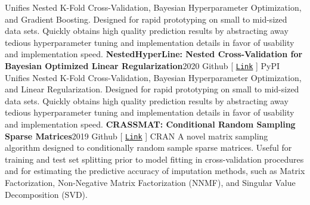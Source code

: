 \documentclass{article}
\begin{document}
        Unifies Nested K-Fold Cross-Validation, Bayesian Hyperparameter Optimization, and Gradient Boosting. Designed for rapid prototyping on small to mid-sized data sets. Quickly obtains high quality prediction results by abstracting away tedious hyperparameter tuning and implementation details in favor of usability and implementation speed.\newline\newline
        \textbf{NestedHyperLine: Nested Cross-Validation for Bayesian Optimized Linear Regularization}\hfill{2020}\newline
        \faGithub\space Github [ \href{https://github.com/nickkunz/nestedhyperline}{\texttt{Link}} ] \space\faPython\space PyPI\newline\newline
        Unifies Nested K-Fold Cross-Validation, Bayesian Hyperparameter Optimization, and Linear Regularization. Designed for rapid prototyping on small to mid-sized data sets. Quickly obtains high quality prediction results by abstracting away tedious hyperparameter tuning and implementation details in favor of usability and implementation speed.\newline\newline
        \textbf{CRASSMAT: Conditional Random Sampling Sparse Matrices}\hfill{2019}\newline
        \faGithub\space Github [ \href{https://github.com/nickkunz/crassmat}{\texttt{Link}} ] \space\faRProject\space CRAN\newline\newline
        A novel matrix sampling algorithm designed to conditionally random sample sparse matrices. Useful for training and test set splitting prior to model fitting in cross-validation procedures and for estimating the predictive accuracy of imputation methods, such as Matrix Factorization, Non-Negative Matrix Factorization (NNMF), and Singular Value Decomposition (SVD).
\newpage
\end{document}
